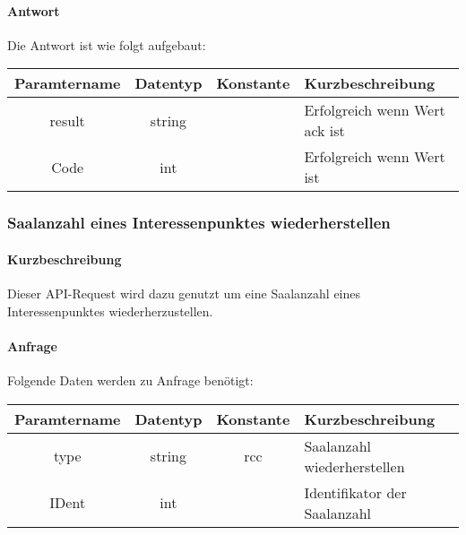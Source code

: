 \paragraph{Antwort}Die Antwort ist wie folgt aufgebaut:
\begin{table}[H]
	\begin{tabular}{|c|c|c|p{6.5cm}|}
		\hline
		\textbf{Paramtername} & \textbf{Datentyp} & \textbf{Konstante} & \textbf{Kurzbeschreibung}                                                                                               \\ \hline
		result              & string           &                 & Erfolgreich wenn Wert {\glqq ack\grqq} ist \\ \hline
		Code                & int              &                 & Erfolgreich wenn Wert {\glqq 0\grqq} ist \\ \hline
	\end{tabular}
\end{table}
\subsubsection{Saalanzahl eines Interessenpunktes wiederherstellen}
\paragraph{Kurzbeschreibung}Dieser API-Request wird dazu genutzt um eine Saalanzahl eines Interessenpunktes wiederherzustellen.
\paragraph{Anfrage}Folgende Daten werden zu Anfrage benötigt:
\begin{table}[H]
	\begin{tabular}{|c|c|c|p{6.5cm}|}
		\hline
		\textbf{Paramtername} & \textbf{Datentyp} & \textbf{Konstante} & \textbf{Kurzbeschreibung}                                                                                               \\ \hline
		type                & string            & rcc                & Saalanzahl wiederherstellen \\ \hline
		IDent               & int               &                    & Identifikator der Saalanzahl \\ \hline
	\end{tabular}
\end{table}
